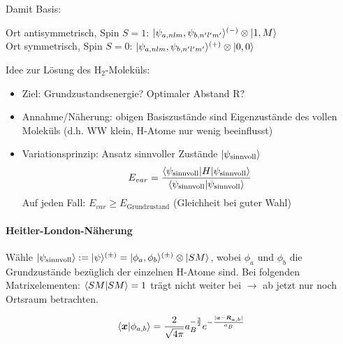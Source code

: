 \documentclass[11pt,a4paper]{report}
\renewcommand{\vec}{\boldsymbol}
\begin{document}
Damit Basis:\par 
Ort antisymmetrisch, Spin $S=1$: $|\psi_{a,nlm},\psi_{b,n'l'm'}\rangle^{(-)}\otimes|1,M\rangle$\\
Ort symmetrisch, Spin $S=0$: $|\psi_{a,nlm},\psi_{b,n'l'm'}\rangle^{(+)}\otimes|0,0\rangle$\par 

Idee zur Lösung des H$_2$-Moleküls:
\begin{itemize}
\item Ziel: Grundzustandsenergie? Optimaler Abstand R?
\item Annahme/Näherung: obigen Basiszustände sind Eigenzustände des vollen Moleküls (d.h. WW klein, H-Atome nur wenig beeinflusst)
\item Variationsprinzip: Ansatz sinnvoller Zustände $|\psi_{\text{sinnvoll}}\rangle$
$$E_{var}=\frac{\langle \psi_{\text{sinnvoll}}|H|\psi_{\text{sinnvoll}}\rangle}{\langle \psi_{\text{sinnvoll}} | \psi_{\text{sinnvoll}} \rangle}$$
Auf jeden Fall: $E_{var}\geq E_{\text{Grundzustand}}$ (Gleichheit bei guter Wahl)
\end{itemize}
\paragraph{Heitler-London-Näherung}\mbox{}\par 

Wähle $|\psi_{\text{sinnvoll}}\rangle:=|\psi\rangle^{(\pm )}=|\phi_a,\phi_b\rangle^{(\pm )}\otimes|SM\rangle$, wobei $\phi_a$ und $\phi_b$ die Grundzustände bezüglich der einzelnen H-Atome sind. Bei folgenden Matrixelementen: $\langle SM | SM \rangle=1$ trägt nicht weiter bei $\rightarrow$ ab jetzt nur noch Ortsraum betrachten.

$$\sprod{\vec{x}}{\phi_{a,b}}=\frac{2}{\sqrt{4\pi}}a_B^{-\frac{3}{2}}e^{-\frac{|\vec{x}-\vec{R}_{a,b}|}{a_B}}$$
\end{document}
